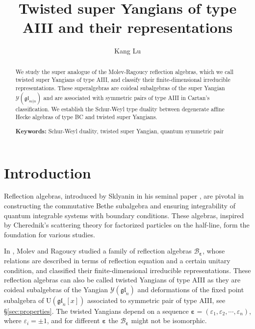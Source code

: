 \documentclass[11pt,reqno]{amsart}
\numberwithin{equation}{section}
\theoremstyle{definition}
\theoremstyle{remark}
\newcommand{\gl}{\mathfrak{gl}}
\newcommand{\ve}{\varepsilon}
\begin{document}
\pagestyle{myheadings}
\setcounter{page}{1}

\title[Twisted super Yangians of type AIII]{Twisted super Yangians of type AIII and their representations}

\author{Kang Lu}
\address{Department of Mathematics, University of Virginia, Charlottesville, VA 22903, USA}

\begin{abstract}
We study the super analogue of the Molev-Ragoucy reflection algebras, which we call twisted super Yangians of type AIII, and classify their finite-dimensional irreducible representations. These superalgebras are coideal subalgebras of the super Yangian $\mathscr{Y}(\gl_{m|n})$ and are associated with symmetric pairs of type AIII in Cartan's classification.
We establish the Schur-Weyl type duality between degenerate affine Hecke algebras of type BC and twisted super Yangians.

		\medskip

		\noindent
		{\bf Keywords:} Schur-Weyl duality, twisted super Yangian, quantum symmetric pair

\end{abstract}


\maketitle
\setcounter{tocdepth}{1}
\tableofcontents

\thispagestyle{empty}


\section{Introduction}
Reflection algebras, introduced by Sklyanin in his seminal paper \cite{Sklyanin1988Boundary}, are pivotal in constructing the commutative Bethe subalgebra and ensuring integrability of quantum integrable systems with boundary conditions. These algebras, inspired by Cherednik's scattering theory \cite{Cherednik1984Factorizing} for factorized particles on the half-line, form the foundation for various studies.

In \cite{Molev2002reflection}, Molev and Ragoucy studied a family of reflection algebras $\mathscr B_{\bm\ve}$, whose relations are described in terms of reflection equation and a certain unitary condition, and classified their finite-dimensional irreducible representations. These reflection algebras can also be called twisted Yangians of type AIII as they are coideal subalgebras of the Yangian $\mathscr Y(\gl_n)$ and deformations of the fixed point subalgebra of $\mathrm U(\gl_{n}[x])$ associated to symmetric pair of type AIII, see \S\ref{sec:properties}. The twisted Yangians depend on a sequence $\bm\ve=(\ve_1,\ve_2,\cdots,\ve_n)$, where $\ve_i=\pm 1$, and for different $\bm\ve$ the $\mathscr B_{\bm\ve}$ might not be isomorphic.
\end{document}
